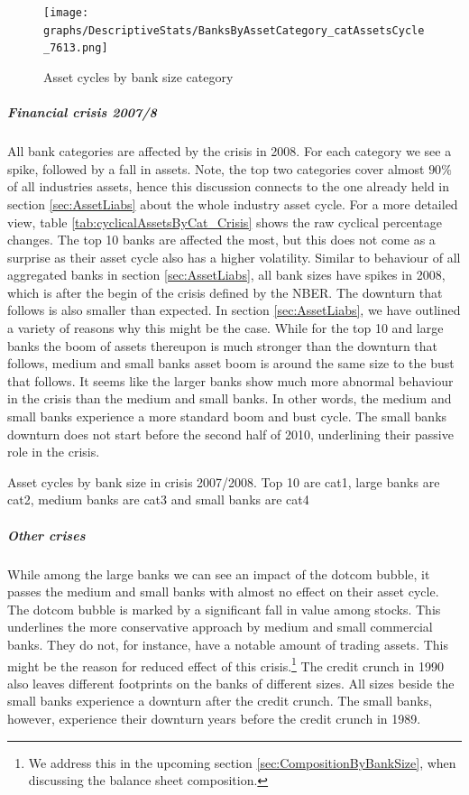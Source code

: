 \documentclass[12pt, a4paper]{article} %
\begin{document}
\begin{figure}[H]
\begin{minipage}{\textwidth}
\texttt{[image: graphs/DescriptiveStats/BanksByAssetCategory\_catAssetsCycle\_7613.png]}
\centering
\caption[1]{Asset cycles by bank size category}
\label{fig:catassetscycle}
\end{minipage}
\end{figure}

\subparagraph{Financial crisis 2007/8}
All bank categories are affected by the crisis in 2008. For each category we see a spike, followed by a fall in assets. Note, the top two categories cover almost $90\%$ of all industries assets, hence this discussion connects to the one already held in section \ref{sec:AssetLiabs} about the whole industry asset cycle.
For a more detailed view, table \ref{tab:cyclicalAssetsByCat_Crisis} shows the raw cyclical percentage changes.
The top 10 banks are affected the most, but this does not come as a surprise as their asset cycle also has a higher volatility. Similar to behaviour of all aggregated banks in section \ref{sec:AssetLiabs}, all bank sizes have spikes in 2008, which is after the begin of the crisis defined by the NBER. The downturn that follows is also smaller than expected. In section \ref{sec:AssetLiabs}, we have outlined a variety of reasons why this might be the case. While for the top 10 and large banks the boom of assets thereupon is much stronger than the downturn that follows, medium and small banks asset boom is around the same size to the bust that follows. It seems like the larger banks show much more abnormal behaviour in the crisis than the medium and small banks. In other words, the medium and small banks experience a more standard boom and bust cycle.
The small banks downturn does not start before the second half of 2010, underlining their passive role in the crisis.


\begin{table}[H]
\begin{minipage}{\textwidth}

\caption[1]{Asset cycles by bank size in crisis 2007/2008. Top 10 are cat1, large banks are cat2, medium banks are cat3 and small banks are cat4}
\label{tab:cyclicalAssetsByCat_Crisis}
\end{minipage}
\end{table}

\subparagraph{Other crises}
While among the large banks we can see an impact of the dotcom bubble, it passes the medium and small banks with almost no effect on their asset cycle. The dotcom bubble is marked by a significant fall in value among stocks. 
This underlines the more conservative approach by medium and small commercial banks. They do not, for instance, have a notable amount of trading assets. This might be the reason for reduced effect of this crisis.\footnote{We address this in the upcoming section \ref{sec:CompositionByBankSize}, when discussing the balance sheet composition.}
The credit crunch in 1990 also leaves different footprints on the banks of different sizes. All sizes beside the small banks experience a downturn after the credit crunch. The small banks, however, experience their downturn years before the credit crunch in 1989. 
\end{document}
